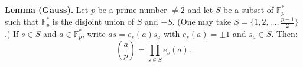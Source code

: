 \textbf{Lemma (Gauss).} Let $p$ be a prime number $\neq 2$ and let $S$ be a subset of $\mathbb{F}_p^*$ such that $\mathbb{F}_p^*$ is the disjoint union of $S$ and $-S$. (One may take $S = \{1, 2, \ldots, \frac{p-1}{2}\}$.) If $s \in S$ and $a \in \mathbb{F}_p^*$, write $as = e_s(a) s_a$ with $e_s(a) = \pm 1$ and $s_a \in S$. Then:
$$\left(\frac{a}{p}\right) = \prod_{s \in S} e_s(a).$$
